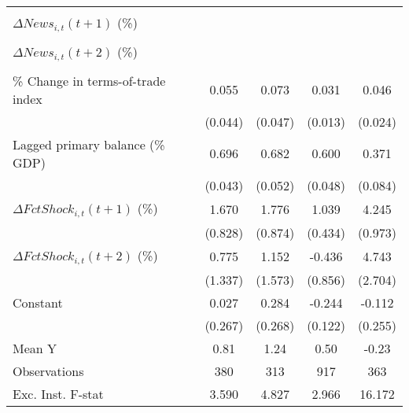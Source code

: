 {\begin{tabular}{l*{4}{c}}
                    &                     &                     &                     &                     \\
\addlinespace
$ \Delta News_{i,t}(t+1)$ (\%)&                     &                     &                     &                     \\
                    &                     &                     &                     &                     \\
\addlinespace
$ \Delta News_{i,t}(t+2)$ (\%)&                     &                     &                     &                     \\
                    &                     &                     &                     &                     \\
\addlinespace
\% Change in terms-of-trade index&       0.055         &       0.073         &       0.031\sym{**} &       0.046\sym{*}  \\
                    &     (0.044)         &     (0.047)         &     (0.013)         &     (0.024)         \\
\addlinespace
Lagged primary balance (\% GDP)&       0.696\sym{***}&       0.682\sym{***}&       0.600\sym{***}&       0.371\sym{***}\\
                    &     (0.043)         &     (0.052)         &     (0.048)         &     (0.084)         \\
\addlinespace
$ \Delta FctShock_{i,t}(t+1)$ (\%)&       1.670\sym{*}  &       1.776\sym{*}  &       1.039\sym{**} &       4.245\sym{***}\\
                    &     (0.828)         &     (0.874)         &     (0.434)         &     (0.973)         \\
\addlinespace
$ \Delta FctShock_{i,t}(t+2)$ (\%)&       0.775         &       1.152         &      -0.436         &       4.743\sym{*}  \\
                    &     (1.337)         &     (1.573)         &     (0.856)         &     (2.704)         \\
\addlinespace
Constant            &       0.027         &       0.284         &      -0.244\sym{*}  &      -0.112         \\
                    &     (0.267)         &     (0.268)         &     (0.122)         &     (0.255)         \\
\midrule
Mean Y              &        0.81         &        1.24         &        0.50         &       -0.23         \\
Observations        &         380         &         313         &         917         &         363         \\
Exc. Inst. F-stat   &       3.590         &       4.827         &       2.966         &      16.172         \\
\bottomrule
\end{tabular}
}
